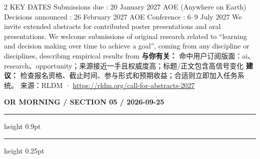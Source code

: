 \documentclass[10.5pt]{ctexart}
\begin{document}
\begin{multicols}{2}
KEY DATES Submissions due : 20 January 2027 AOE (Anywhere on Earth) Decisions announced : 26 February 2027 AOE Conference : 6–9 July 2027 We invite extended abstracts for contributed poster presentations and oral presentations. We welcome submissions of original research related to “learning and decision making over time to achieve a goal”, coming from any discipline or disciplines, describing empirical results from 
\textbf{与你有关：} 命中用户订阅版面：ai、research、opportunity；来源接近一手且权威度高；标题/正文包含高信号变化
\textbf{建议：} 检查报名资格、截止时间、参与形式和预期收益；合适则立即加入任务系统。
{\footnotesize\color{ormuted} 来源：RLDM · \url{https://rldm.org/call-for-abstracts-2027}}
\end{multicols}
\newpage
{\small\bfseries OR MORNING / SECTION 05 / 2026-09-25}
\vspace{2mm}
\hrule height 0.9pt
\vspace{1.5mm}
\hrule height 0.25pt
\vspace{4mm}
\end{document}
